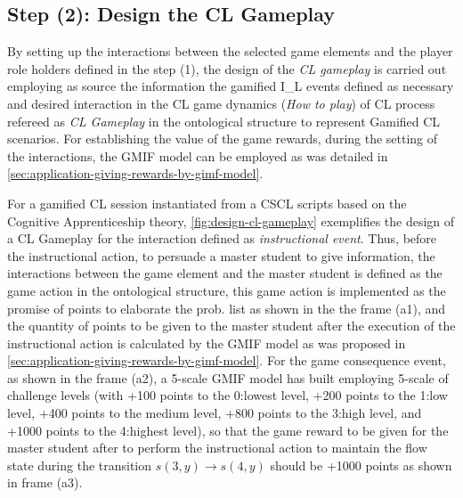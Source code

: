 

\subsection*{Step (2): Design the CL Gameplay}

By setting up the interactions between the selected game elements and the player role holders defined in the step (1), the design of the \emph{CL gameplay} is carried out employing as source the information the gamified I\_L events defined as necessary and desired interaction in the CL game dynamics (\emph{How to play}) of CL process refereed as \emph{CL Gameplay} in the ontological structure to represent Gamified CL scenarios. For establishing the value of the game rewards, during the setting of the interactions, the GMIF model can be employed as was detailed in \autoref{sec:application-giving-rewards-by-gimf-model}.

For a gamified CL session instantiated from a CSCL scripts based on the Cognitive Apprenticeship theory, \autoref{fig:design-cl-gameplay} exemplifies the design of a CL Gameplay for the interaction  defined as \emph{instructional event}. Thus, before the instructional action, to persuade a master student to give information, the interactions between the game element  and the master student is defined as the game action  in the ontological structure, this game action is implemented as the promise of points to elaborate the prob. list as shown in the the frame (a1), and the quantity of points to be given to the master student after the execution of the instructional action  is calculated by the GMIF model as was proposed in \autoref{sec:application-giving-rewards-by-gimf-model}. For the game consequence event, as shown in the frame (a2), a 5-scale GMIF model has built employing 5-scale of challenge levels (with +100 points to the 0:lowest level, +200 points to the 1:low level, +400 points to the medium level, +800 points to the 3:high level, and +1000 points to the 4:highest level), so that the game reward to be given for the master student after to perform the instructional action to maintain the flow state during the transition $s(3,y) \to s(4,y)$ should be +1000 points as shown in frame (a3).

